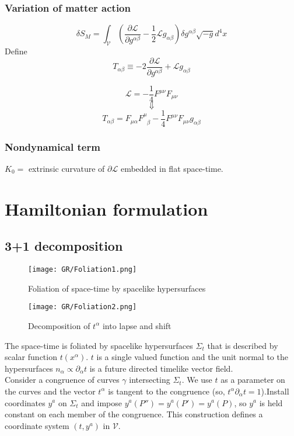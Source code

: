 \subsubsection{Variation of matter action}
\[\delta S_M = \int_{\mathcal{V}} \left( \frac{\partial \mathcal{L}}{\partial g^{\alpha \beta}} - \frac{1}{2} \mathcal{L} g_{\alpha \beta} \right) \delta g^{\alpha \beta} \sqrt{-g} d^4 x\]
Define
\[T_{\alpha \beta} \equiv -2 \frac{\partial \mathcal{L}}{\partial g^{\alpha \beta}} + \mathcal{L} g_{\alpha \beta}\]
\begin{example}
\[\mathcal{L} = -\frac{1}{4} F^{\mu \nu}F_{\mu \nu}\]
\[\Downarrow\]
\[T_{\alpha \beta} = F_{\mu \alpha} F^{\mu}_{\phantom{\mu} \beta} - \frac{1}{4} F^{\mu \nu} F_{\mu \nu} g_{\alpha \beta}\]
\end{example}
\subsubsection{Nondynamical term}
$K_0 = $ extrinsic curvature of $\partial \mathcal{L}$ embedded in flat space-time.

\section{Hamiltonian formulation}
\subsection{3+1 decomposition}
\begin{figure}[!h]
\begin{minipage}[t]{0.5\linewidth}
\centering
\texttt{[image: GR/Foliation1.png]}
\caption{Foliation of space-time by spacelike hypersurfaces}
\label{fig:side:a}
\end{minipage}%
\begin{minipage}[t]{0.5\linewidth}
\centering
\texttt{[image: GR/Foliation2.png]}
\caption{Decomposition of $t^{\alpha}$ into lapse and shift}
\label{fig:side:b}
\end{minipage}
\end{figure}
\noindent
The space-time is foliated by spacelike hypersurfaces $\Sigma_t$ that is described by scalar function $t(x^{\alpha})$. $t$ is a single valued function and the unit normal to the hypersurfaces $n_{\alpha} \propto \partial_{\alpha} t$ is a future directed timelike vector field.\\
Consider a congruence of curves $\gamma$ intersecting $\Sigma_t$. We use $t$ as a parameter on the curves and the vector $t^{\alpha}$ is tangent to the congruence (so, $t^{\alpha} \partial_{\alpha}t = 1$).Install coordinates $y^a$ on $\Sigma_t$ and impose $y^a(P'') = y^a(P') = y^a(P)$, so $y^a$ is held constant on each member of the congruence. This construction defines a coordinate system $(t,y^a)$ in $\mathcal{V}$.\\
